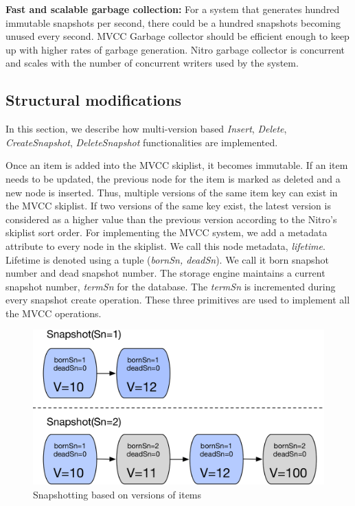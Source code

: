 \documentclass{vldb}
\begin{document}
\textbf{Fast and scalable garbage collection:} For a system that generates hundred immutable snapshots per second, there could be a hundred snapshots becoming unused every second. MVCC Garbage collector should be efficient enough to keep up with higher rates of garbage generation. Nitro garbage collector is concurrent and scales with the number of concurrent writers used by the system.

\subsection{Structural modifications}
In this section, we describe how multi-version based \textit{Insert}, \textit{Delete}, \textit{CreateSnapshot}, \textit{DeleteSnapshot} functionalities are implemented.


Once an item is added into the MVCC skiplist, it becomes immutable. If an item needs to be updated, the previous node for the item is marked as deleted and a new node is inserted. Thus, multiple versions of the same item key can exist in the MVCC skiplist. If two versions of the same key exist, the latest version is considered as a higher value than the previous version according to the Nitro's skiplist sort order. For implementing the MVCC system, we add a metadata attribute to every node in the skiplist. We call this node metadata, \textit{lifetime}. Lifetime is denoted using a tuple (\textit{bornSn, deadSn}). We call it born snapshot number and dead snapshot number. The storage engine maintains a current snapshot number, \textit{termSn} for the database. The \textit{termSn} is incremented during every snapshot create operation. These three primitives are used to implement all the MVCC operations. 

 \begin{figure}[H]
\includegraphics[scale=0.5]{images/fig-4}
\caption{Snapshotting based on versions of items}
\label{fig:mvcc}
\end{figure}
\end{document}
